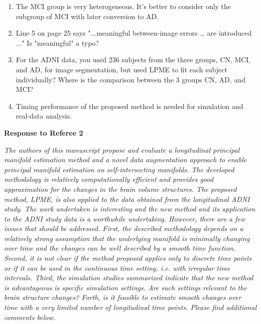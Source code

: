 \documentclass{article}
\theoremstyle{definition}
\begin{document}
\begin{enumerate}
\item The MCI group is very heterogeneous. It's better to consider only the subgroup of MCI with later conversion to AD.

\item Line 5 on page 25 says "...meaningful between-image errors … are introduced ..." Is "meaningful" a typo?

\item For the ADNI data, you used 236 subjects from the three groups, CN, MCI, and AD,  for image segmentation, but used LPME to fit each subject individually? Where is the comparison between the 3 groups CN, AD, and MCI?

\item Timing performance of the proposed method is needed for simulation and real-data analysis.

\end{enumerate}

\vspace{0.3in}


\large{\textbf{Response to Referee 2}}

\vspace{0.25in}

{\it The authors of this manuscript propose and evaluate a longitudinal principal manifold estimation method and a novel data augmentation approach to enable principal manifold estimation on self-intersecting manifolds. The developed methodology is relatively computationally efficient and provides good approximation for the changes in the brain volume structures. The proposed method, LPME, is also applied to the data obtained from the longitudinal ADNI study.  The work undertaken is interesting and the new method and its application to the ADNI study data is a worthwhile undertaking. However, there are a few issues that should be addressed. First, the described methodology depends on a relatively strong assumption that the underlying manifold is minimally changing over time and the changes can be well described by a smooth time function. Second, it is not clear if the method proposed applies only to discrete time points or if it can be used in the continuous time setting, i.e. with irregular time intervals. Third, the simulation studies summarized indicate that the new method is advantageous is specific simulation settings. Are such settings relevant to the brain structure changes? Forth, is it feasible to estimate smooth changes over time with a very limited number of longitudinal time points. Please find additional comments below.}
\end{document}
